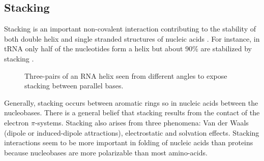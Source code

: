 \documentclass[12pt]{article}
\begin{document}
\subsection{Stacking}
\label{stacking-section}
Stacking is an important non-covalent interaction contributing to the stability of both double helix and single stranded structures of nucleic acids \cite{Hobza2008}. For instance, in tRNA only half of the nucleotides form a helix but about 90\% are stabilized by stacking \cite{Bloomfield1999}. 
\begin{figure} [h!]
\begin{center}
\caption{Three-pairs of an RNA helix seen from different angles to expose  stacking between parallel bases.}
\label{StackingHelix}
\end{center}
\end{figure} 
Generally, stacking occurs between aromatic rings so in nucleic acids between the nucleobases. There is a general belief that stacking results from the contact of the electron $\pi$-systems. Stacking also arises from three phenomena: Van der Waals (dipole or induced-dipole attractions), electrostatic and solvation effects. Stacking interactions seem to be more important in folding of nucleic acids than proteins because nucleobases are more polarizable than most amino-acids. 
\end{document}
